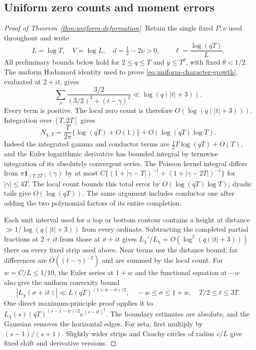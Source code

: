 \subsection{Uniform zero counts and moment errors}
\begin{proof}[Proof of Theorem~\ref{thm:uniform-deformation}]
Retain the single fixed $P,\nu$ used throughout and write
\[
 L=\log T,\quad V=\log L,\quad d=\tfrac12-2\nu>0,
 \qquad \ell=\frac{\log(qT)}L.
\]
All preliminary bounds below hold for $2\le q\le T$ and
$y\le T^\theta$, with fixed $\theta<1/2$.
The uniform Hadamard identity used to prove
\eqref{eq:uniform-character-growth}, evaluated at $2+it$, gives
\[
 \sum_\rho\frac{3/2}{(3/2)^2+(t-\gamma)^2}
            \ll\log(q(|t|+3)).
\]
Every term is positive. The local zero count is therefore
$O(\log(q(|t|+3)))$. Integration over $[T,2T]$ gives
\begin{equation}\label{eq:uniform-count-new}
 N_{\chi,T}=\frac T{2\pi}\{\log(qT)+O(1)\}
                              +O(\log(qT)\log T).
\end{equation}
Indeed the integrated gamma and conductor terms are
$\tfrac12T\log(qT)+O(T)$, and the Euler logarithmic derivative has
bounded integral by termwise integration of its absolutely convergent
series. The Poisson kernel integral differs from
$\pi\mathbf1_{(T,2T)}(\gamma)$ by at most
$C\{(1+|\gamma-T|)^{-1}+(1+|\gamma-2T|)^{-1}\}$ for
$|\gamma|\le4T$. The local count bounds this total error by
$O(\log(qT)\log T)$; dyadic tails give $O(\log(qT))$.
The same argument includes conductor one after adding the two
polynomial factors of its entire completion.

Each unit interval used for a top or bottom contour contains a height
at distance $\gg1/\log(q(|t|+3))$ from every ordinate. Subtracting
the completed partial fractions at $2+it$ from those at $\sigma+it$
gives $L_\chi'/L_\chi=O(\log^2(q(|t|+3)))$ there on every fixed
strip used above. Near terms use the distance bound; far differences
are $O((t-\gamma)^{-2})$ and are summed by the local count.
For $w=C/L\le1/10$, the Euler series at $1+w$ and the functional
equation at $-w$ also give the uniform convexity bound
\[
 |L_\chi(\sigma+it)|\ll L(qT)^{(1+w-\sigma)/2},
       \quad -w\le\sigma\le1+w,\quad T/2\le t\le3T.
\]
One direct maximum-principle proof applies it to
$L_\chi(s)(qT)^{(s-1-w)/2}e^{(s-it)^2}$.
The boundary estimates are absolute, and the Gaussian removes the
horizontal edges. For zeta, first multiply by $(s-1)/(s+1)$.
Slightly wider strips and Cauchy circles of radius $c/L$ give fixed
shift and derivative versions.


\end{proof}
